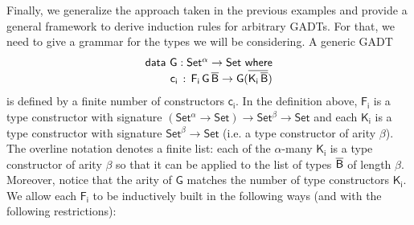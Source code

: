 \documentclass[9pt]{entcs} \usepackage{entcsmacro}
\begin{document}
Finally, we generalize the approach taken in the previous examples
and provide a general framework to derive induction rules for arbitrary GADTs.
For that, we need to give a grammar for the types we will be considering.
A generic GADT
\begin{equation*}
\begin{array}{l}
\mathsf{data\ G : Set^\alpha \to Set\ where}\\
\mathsf{\;\;\;\;\;\;\;\;c_i\, :\, F_i\,G\,\overline{B} \to G (\overline{K_i\,\overline{B}})}
\end{array}
\end{equation*}
is defined by a finite number of constructors $\mathsf{c_i}$.
In the definition above, $\mathsf{F_i}$ is a type constructor with signature $\mathsf{(Set^{\alpha} \to Set) \to Set^{\beta} \to Set}$
and each $\mathsf{K_i}$ is a type constructor with signature $\mathsf{Set^{\beta} \to Set}$
(i.e. a type constructor of arity $\mathsf{\beta}$).
The overline notation denotes a finite list:
each of the $\mathsf{\alpha}$-many $\mathsf{K_i}$ is a type constructor of arity $\mathsf{\beta}$
so that it can be applied to the list of types $\mathsf{\overline{B}}$ of length $\mathsf{\beta}$.
Moreover, notice that the arity of $\mathsf{G}$ matches the number of type constructors $\mathsf{K_i}$.
We allow each $\mathsf{F_i}$ to be inductively built in the following ways (and with the following restrictions):
\end{document}

